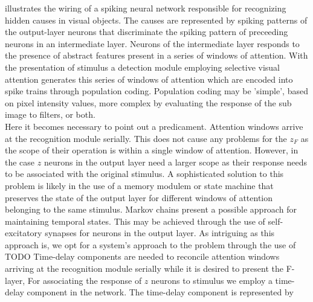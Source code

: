 \documentclass{report}
\begin{document}
 illustrates the wiring of a spiking neural network responsible for recognizing hidden causes in visual objects. The causes are represented by spiking patterns of the output-layer neurons that discriminate the spiking pattern of preceeding neurons in an intermediate layer. Neurons of the intermediate layer responds to the presence of abstract features present in a series of windows of attention. With the presentation of stimulus a detection module employing selective visual attention generates this series of windows of attention which are encoded into spike trains through population coding. Population coding may be 'simple', based on pixel intensity values, more complex by evaluating the response of the sub image to filters, or both.\\
Here it becomes necessary to point out a predicament. Attention windows arrive at the recognition module serially. This does not cause any problems for the $z_F$ as the scope of their operation is within a single window of attention. However, in the case $z$ neurons in the output layer need a larger scope as their response needs to be associated with the original stimulus. A sophisticated solution to this problem is likely in the use of a memory modulem or state machine that preserves the state of the output layer for different windows of attention belonging to the same stimulus. Markov chains present a possible approach for maintaining temporal states. This may be achieved through the use of self-excitatory synapses for neurons in the output layer. As intriguing as this approach is, we opt for a system's approach to the problem through the use of TODO   
Time-delay components are needed to reconcile attention windows arriving at the recognition module serially while it is desired to present the F-layer,  For associating the response of $z$ neurons to stimulus we employ a time-delay component in the network. The time-delay component is represented by 
\end{document}
